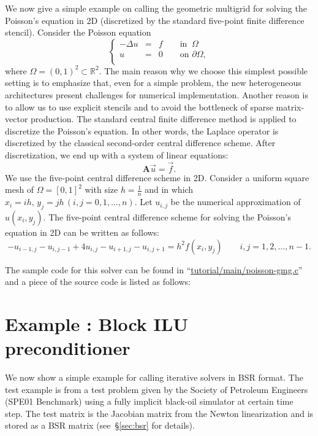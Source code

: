 \documentclass[11pt]{memoir}
\begin{document}
We now give a simple example on calling the geometric multigrid for solving the Poisson's equation in 2D (discretized by the standard five-point finite difference stencil). Consider the Poisson equation
\begin{equation*}
\left\{
\begin{array}{rcl}
    - \Delta u &=&  f  \qquad \mbox{in }~\Omega \\
      u &=& 0  \qquad \mbox{on }\partial\Omega, \\
\end{array}
\right.
\end{equation*}
where $\Omega = (0,1)^2 \subset \mathbb{R}^2$.
%
The main reason why we choose this simplest possible setting is to emphasize that, even for a simple problem, the new heterogeneous architectures present challenges for numerical implementation. Another reason is to allow us to use explicit stencils and to avoid the bottleneck of sparse matrix-vector production. 
%
The standard central finite difference method is applied to discretize the Poisson's equation. In other words, the Laplace operator is discretized by the classical second-order central difference scheme. After discretization, we end up with a system of linear equations:
%
     \begin{equation*}
        \mathbf{A}\vec{u} = \vec{f}.
    \end{equation*}
%    
We use the five-point central difference scheme in 2D. Consider a uniform square mesh of $\Omega = [0, 1]^2$
with size $h = \frac{1}{n}$ and in which $x_i = ih, \, y_j = jh \, (i, j = 0,
1,\ldots, n)$. Let $u_{i,j}$ be the numerical approximation of $u(x_i , y_j )$. The five-point central
difference scheme for solving the Poisson's equation in 2D can be written as follows:
$$
{-u_{i-1,j}-u_{i,j-1}+4u_{i,j}-u_{i+1,j}-u_{i,j+1}}={h^2}f(x_i,y_j)
\qquad i, j=1,2,\ldots,n-1.
$$

The sample code for this solver can be found in ``\url{tutorial/main/poisson-gmg.c}'' and a piece of the source code is listed as follows:
%

%

\section{Example : Block ILU preconditioner}\label{sec:ex5}
\addtocounter{ex}{1}

We now show a simple example for calling iterative solvers in BSR format. The test example is from a test problem given by the Society of Petroleum Engineers (SPE01 Benchmark) using a fully implicit black-oil simulator at certain time step. The test matrix is the Jacobian matrix from the Newton linearization and is stored as a BSR matrix (see~\S\ref{sec:bsr} for details). 
\end{document}
